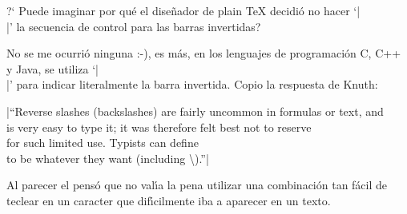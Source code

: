 

\bigskip

\enunciadoS ?` Puede imaginar por qu\'e el dise\~nador de plain {\TeX}
decidi\'o no hacer `|\\|' la secuencia de control para las barras
invertidas?

\bigskip

\respuestaS No se me ocurri\'o ninguna :-), es m\'as, en los lenguajes
de programaci\'on C, C++ y Java, se utiliza `|\\|' para indicar
literalmente la barra invertida. Copio la respuesta de Knuth:

\medskip

\noindent|``Reverse slashes (backslashes) are fairly uncommon in
formulas or text, and \\ is very easy to type it; it was therefore
felt best not to reserve \\ for such limited use. Typists can define
\\ to be whatever they want (including \backslash).''|

\medskip

Al parecer el pens\'o que no val\'{\i}a la pena utilizar una
combinaci\'on tan f\'acil de teclear en un caracter que
dif\'{\i}cilmente iba a aparecer en un texto.

\bye

